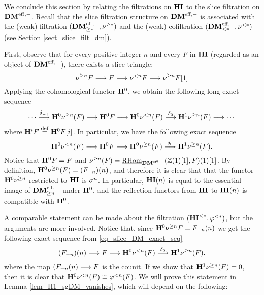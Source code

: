 We conclude this section by relating the filtrations on $\HI$
to the slice filtration on $\DMeff$. Recall that the slice 
filtration structure on $\DMeff$ is associated with the (weak) 
filtration $(\GFiltDM[*]{\DMeff}, \sgDM{*})$ and the (weak) 
cofiltration $(\LFiltDM[*]{\DMeff}, \slDM{*})$ (see Section
\ref{sect_slice_filt_dm}).

First, observe that for every positive integer $n$ and every $F$ 
in $\HI$ (regarded as an object of $\DMeff$), there exists a slice 
triangle:
\[
\sliceTriangle{n}{F}
\]
Applying the cohomological functor $\HH^0$, we obtain the
following long exact sequence
\[
\cdots \stackrel{\delta_{-1}}{\to} \HH^0 \sgDM{n}(F) \to 
   \HH^0 F \to \HH^0 \slDM{n}(F)
   \stackrel{\delta_0}{\to} \HH^1 \sgDM{n}(F) \to \cdots
\]
where $\HH^i F \defeq \HH^0F[i]$. In particular, we
have the following exact sequence
\begin{equation}\label{eq_slice_DM_exact_seq}
\HH^0 \slDM{n}(F) \to \HH^0 F \to \HH^0 
\sgDM{n}(F) \stackrel{\delta_0}{\to} \HH^1 \sgDM{n}(F).
\end{equation}
Notice that $\HH^0F = F$ and $\sgDM{n}(F) = 
\ihomDMf(\Z(1)[1], F)(1)[1]$. By definition, $\HH^0 \sgDM{n}(F) 
= \LHI[n]{(\RHI[n]{F})}$, and therefore it is clear that
that the functor $\HH^0 \sgDM{n}$ restricted to $\HI$ is 
$\sgHI{n}$. In particular, $\HI(n)$ is equal to the essential
image of $\GFiltDM[n]{\DMeff}$ under $\HH^0$, and the reflection 
functors from $\HI$ to $\HI(n)$ is compatible with $\HH^0$.

A comparable statement can be made about the filtration 
$(\TFHI{*}, \tlHI{*})$, but the arguments are more involved.
Notice that, since $\HH^0\sgDM{n}F = \LHI[n]{\RHI[n]{F}}$ we get 
the following exact sequence from \eqref{eq_slice_DM_exact_seq}
\[
\LHI[n]{(\RHI[n]{F})} \to F \to \HH^0{\slDM{n}(F)} 
   \stackrel{\delta_0}{\to} \HH^1 \sgDM{n}(F).
\]
where the map $\LHI[n]{(\RHI[n]{F}} \to F$ is the counit. If we 
show that $\HH^1 \sgDM{n}(F) = 0$, then it is clear that
$\HH^0 \slDM{n}(F) \cong \tlHI{n}(F)$. We will prove this 
statement in Lemma \ref{lem_H1_sgDM_vanishes}, which will depend
on the following:

